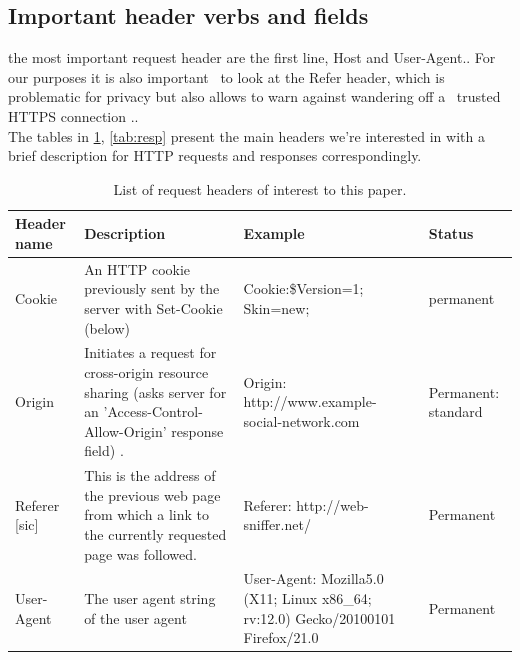 \subsection{Important header verbs and fields}

the most important request header are the first line, Host and User-Agent.. For our purposes it is also important \
to look at the Refer header, which is problematic for privacy but also allows to warn against wandering off a \
trusted HTTPS connection ..\\

The tables in \ref{tab:req}, \ref{tab:resp} present the main headers we're interested in with a brief description for HTTP requests and responses correspondingly.\

\begin{table}
\centering
\begin{tabular}{p{2cm}|p{6cm}|p{4cm}|p{2cm}}
Header name & Description & Example & Status \\\hline

Cookie & An HTTP cookie previously sent by the server with Set-Cookie (below) & Cookie:\$Version=1; Skin=new; & permanent \\
Origin &Initiates a request for cross-origin resource sharing (asks server for an 'Access-Control-Allow-Origin' response field) . & Origin: http://www.example-social-network.com & Permanent: standard\\
Referer [sic] & This is the address of the previous web page from which a link to the currently requested page was followed. & Referer: http://web-sniffer.net/ & Permanent\\
User-Agent & The user agent string of the user agent & User-Agent: Mozilla\/5.0 (X11; Linux x86\_64; rv:12.0) Gecko/20100101 Firefox/21.0 &Permanent
\end{tabular}
\caption{\label{tab:req}List of request headers of interest to this paper.}
\end{table}


